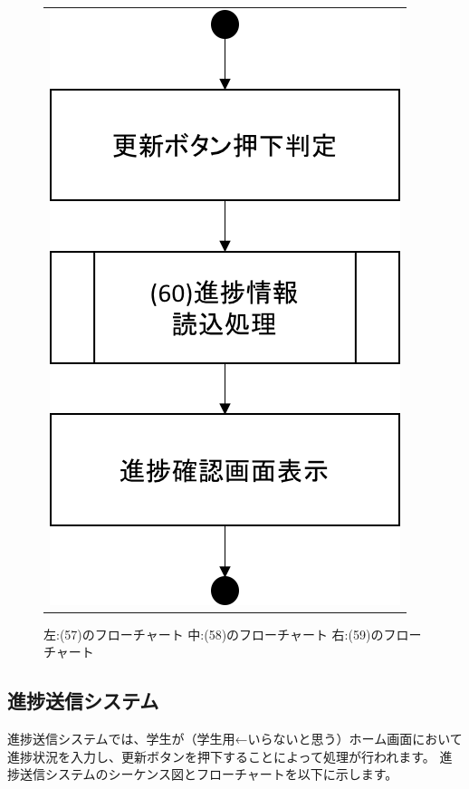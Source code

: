 \begin{figure}[htbp]
\begin{tabular}{c}
\begin{minipage}{0.33\hsize}
\begin{center}
  \end{center}
 \end{minipage}
 \begin{minipage}{0.33\hsize}
  \begin{center}
   \includegraphics[width=0.8\linewidth,clip]{./img/flow/59.png}
  \end{center}
 \end{minipage}
\end{tabular}
 \caption{左:(57)のフローチャート 中:(58)のフローチャート 右:(59)のフローチャート}\label{fig:57to58to59}
\end{figure}


\clearpage




\subsection{進捗送信システム}
進捗送信システムでは、学生が（学生用←いらないと思う）ホーム画面において進捗状況を入力し、更新ボタンを押下することによって処理が行われます。
進捗送信システムのシーケンス図とフローチャートを以下に示します。

